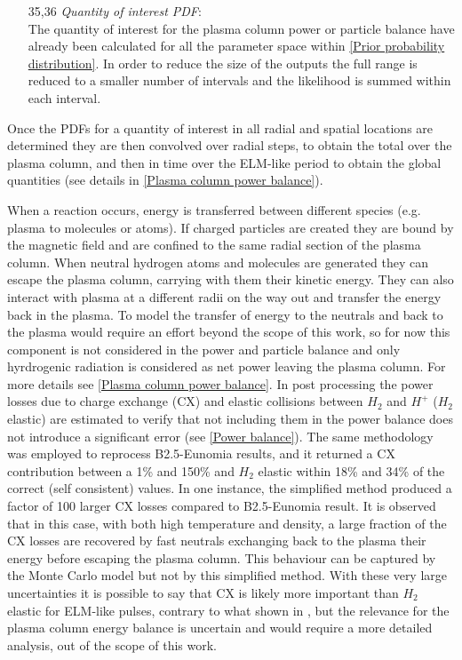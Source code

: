 \begin{enumerate}
    \item[35,36] \emph{Quantity of interest PDF}: \\The quantity of interest for the plasma column power or particle balance have already been calculated for all the parameter space within \autoref{Prior probability distribution}. In order to reduce the size of the outputs the full range is reduced to a smaller number of intervals and the likelihood is summed within each interval.
\end{enumerate}


Once the PDFs for a quantity of interest in all radial and spatial locations are determined they are then convolved over radial steps, to obtain the total over the plasma column, and then in time over the ELM-like period to obtain the global quantities (see details in \autoref{Plasma column power balance}).

When a reaction occurs, energy is transferred between different species (e.g. plasma to molecules or atoms). If charged particles are created they are bound by the magnetic field and are confined to the same radial section of the plasma column. When neutral hydrogen atoms and molecules are generated they can escape the plasma column, carrying with them their kinetic energy. They can also interact with plasma at a different radii on the way out and  transfer the energy back in the plasma. To model the transfer of energy to the neutrals and back to the plasma would require an effort beyond the scope of this work, so for now this component is not considered in the power and particle balance and only hyrdrogenic radiation is considered as net power leaving the plasma column. For more details see \autoref{Plasma column power balance}. In post processing the power losses due to charge exchange (CX) and elastic collisions between $H_2$ and $H^+$ ($H_2$ elastic) are estimated to verify that not including them in the power balance does not introduce a significant error (see \autoref{Power balance}). The same methodology was employed to reprocess B2.5-Eunomia results, and it returned a CX contribution between  a 1\% and 150\% and $H_2$ elastic within 18\% and 34\% of the correct (self consistent) values. In one instance, the simplified method produced a factor of 100 larger CX losses compared to B2.5-Eunomia result. It is observed that in this case, with both high temperature and density, a large fraction of the CX losses are recovered by fast neutrals exchanging back to the plasma their energy before escaping the plasma column. This behaviour can be captured by the Monte Carlo model but not by this simplified method. With these very large uncertainties it is possible to say that CX is likely more important than $H_2$ elastic for ELM-like pulses, contrary to what shown in \cite{Chandra2022}, but the relevance for the plasma column energy balance is uncertain and would require a more detailed analysis, out of the scope of this work.


